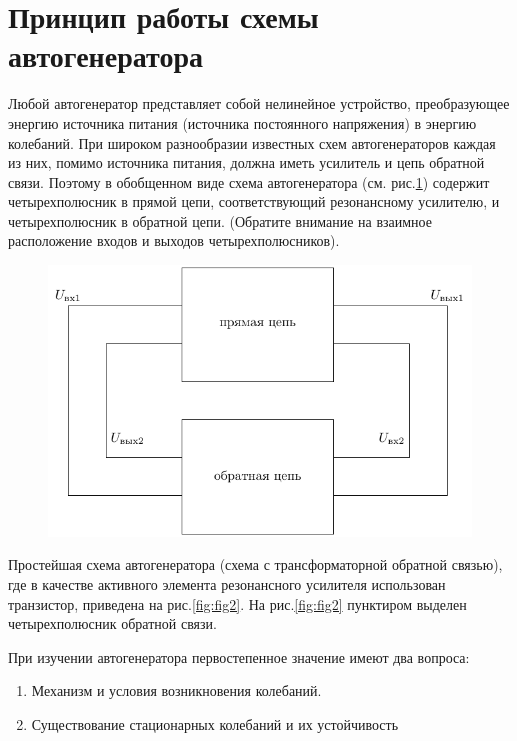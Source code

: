 \section{Принцип работы схемы автогенератора}
Любой автогенератор представляет собой нелинейное устройство, преобразующее энергию источника питания (источника постоянного напряжения) в энергию колебаний. При широком разнообразии известных схем автогенераторов каждая из них, помимо источника питания, должна иметь усилитель и цепь обратной связи. Поэтому в обобщенном виде схема автогенератора (см. рис.\ref{fig:fig1}) содержит четырехполюсник в прямой цепи, соответствующий резонансному усилителю, и четырехполюсник в обратной цепи. (Обратите внимание на взаимное расположение входов и выходов четырехполюсников).
\begin{figure}[h]
	\centering
	\includegraphics[width=0.7\linewidth]{circuit/one.pdf}
	\caption{}
	\label{fig:fig1}
\end{figure}
Простейшая схема автогенератора (схема с трансформаторной обратной связью), где в качестве активного элемента резонансного усилителя использован транзистор, приведена на рис.\ref{fig:fig2}. На рис.\ref{fig:fig2} пунктиром выделен четырехполюсник обратной связи.

При изучении автогенератора первостепенное значение имеют два вопроса:
\begin{enumerate}
\item Механизм и условия возникновения колебаний.
\item Существование стационарных колебаний и их устойчивость
\end{enumerate}


